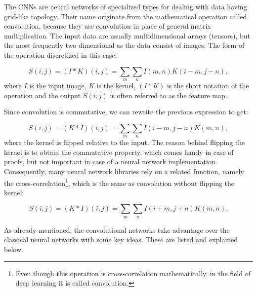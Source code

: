 \documentclass[12pt]{article}
\theoremstyle{plain}
\begin{document}
The CNNs are neural networks of specialized types for dealing with data having grid-like topology. Their name originate from the mathematical operation called convolution, because they use convolution in place of general matrix multiplication. The input data are usually multidimensional arrays (tensors), but the most frequently two dimensional as the data consist of images. The form of the operation discretized in this case:

\begin{equation}
S(i,j) = (I * K)(i,j) = \sum_m \sum_n I(m,n) K(i-m, j-n),
\end{equation}
where $I$ is the input image, $K$ is the kernel, $(I * K)$ is the short notation of the operation and the output $S(i,j)$ is often referred to as the feature map.

Since convolution is commutative, we can rewrite the previous expression to get:

\begin{equation}
S(i,j) = (K * I)(i,j) = \sum_m \sum_n I(i-m,j-n) K(m, n),
\end{equation}
where the kernel is flipped relative to the input. The reason behind flipping the kernel is to obtain the commutative property, which comes handy in case of proofs, but not important in case of a neural network implementation. Consequently, many neural network libraries rely on a related function, namely the cross-correlation\footnote{Even though this operation is cross-correlation mathematically, in the field of deep learning it is called convolution.}, which is the same as convolution without flipping the kernel:

\begin{equation}
S(i,j) = (K * I)(i,j) = \sum_m \sum_n I(i+m,j+n) K(m, n).
\end{equation}

As already mentioned, the convolutional networks take advantage over the classical neural networks with some key ideas. These are listed and explained below.
\end{document}
